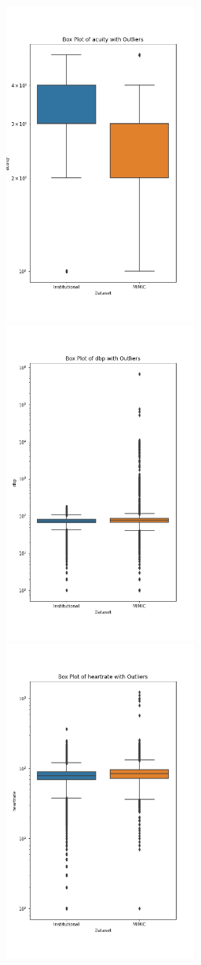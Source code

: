 \documentclass{article}
\theoremstyle{plain}
\theoremstyle{definition}
\theoremstyle{remark}
\begin{document}
\begin{figure}[h!]
   \centering 
   \includegraphics[width=2.5in]{plots/acuity_triage_boxplot.png} 
   \includegraphics[width=2.5in]{plots/dbp_triage_boxplot.png} 
   \includegraphics[width=2.5in]{plots/heartrate_triage_boxplot.png} 

\end{figure}
\end{document}
